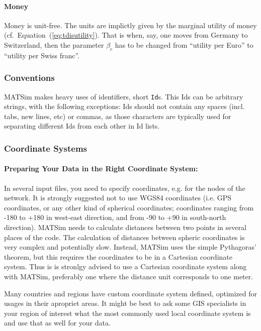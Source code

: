\paragraph{Money}

Money is unit-free.  The units are implictly given by the marginal utility of money (cf.\ Equation~(\ref{eq:tdisutility}).  That is when, say, one moves from Germany to Switzerland, then the parameter $\beta_c$ has to be changed from ``utility per Euro'' to ``utility per Swiss franc''.

\subsubsection{Conventions}
MATSim makes heavy uses of identifiers, short \lstinline|Id|s. This Ids can be arbitrary strings, with the following exceptions: Ids should not contain any spaces (incl. tabs, new lines, etc) or commas, as those characters are typically used for separating different Ids from each other in Id lists. 

\subsubsection{Coordinate Systems}
\label{sec:coordinatesystems}
\paragraph{Preparing Your Data in the Right Coordinate System:}
In several input files, you need to specify coordinates, e.g. for the nodes of the network. It is strongly suggested not to use WGS84 coordinates (i.e. GPS coordinates, or any other kind of spherical coordinates; coordinates ranging from -180 to +180 in west-east direction, and from -90 to +90 in south-north direction). MATSim needs to calculate distances between two points in several places of the code. The calculation of distances between spheric coordinates is very complex and potentially slow. Instead, MATSim uses the simple Pythagoras' theorem, but this requires the coordinates to be in a Cartesian coordinate system. Thus is is stronlgy advised to use a Cartesian coordinate system along with MATSim, preferably one where the distance unit corresponds to one meter.

Many countries and regions have custom coordinate system defined, optimized for usages in their apropriet areas. It might be best to ask some GIS specialists in your region of interest what the most commonly used local coordinate system is and use that as well for your data.

